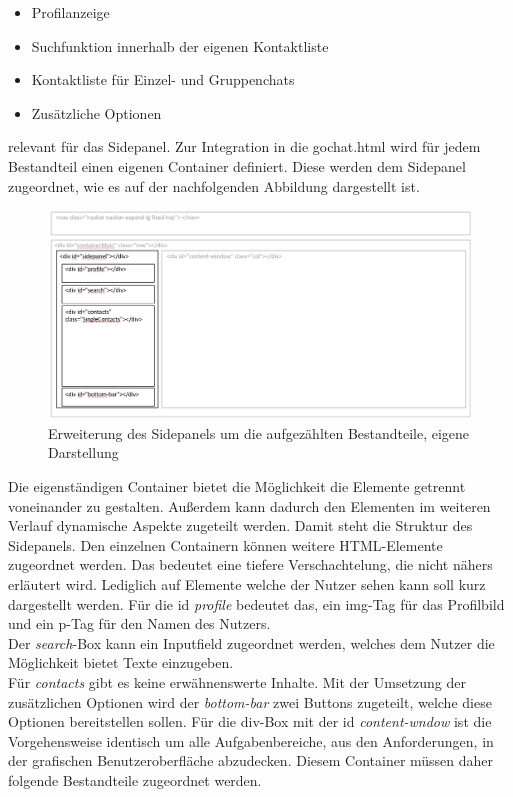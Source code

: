 \documentclass[a4paper,titlepage,halfparskip,12pt]{scrreprt}
\begin{document}
\begin{onehalfspacing}
\begin{itemize}
	\item Profilanzeige
	\item Suchfunktion innerhalb der eigenen Kontaktliste
	\item Kontaktliste für Einzel- und Gruppenchats
	\item Zusätzliche Optionen
\end{itemize}
relevant für das Sidepanel. Zur Integration in die gochat.html wird für jedem Bestandteil einen eigenen Container definiert. Diese werden dem Sidepanel zugeordnet, wie es auf der nachfolgenden Abbildung dargestellt ist.
\begin{figure}[h]
	\centering
	\includegraphics[width=\linewidth]{images/BasisStruktur1GochatSidepanel}
	\caption{Erweiterung des Sidepanels um die aufgezählten Bestandteile, eigene Darstellung}
	\label{img:Sidepanel}
\end{figure}
Die eigenständigen Container bietet die Möglichkeit die Elemente getrennt voneinander zu gestalten. Außerdem kann dadurch den Elementen im weiteren Verlauf dynamische Aspekte zugeteilt werden. Damit steht die Struktur des Sidepanels. Den einzelnen Containern können weitere HTML-Elemente zugeordnet werden. Das bedeutet eine tiefere Verschachtelung, die nicht nähers erläutert wird. Lediglich auf Elemente welche der Nutzer sehen kann soll kurz dargestellt werden. Für die id \textit{profile} bedeutet das, ein img-Tag für das Profilbild und ein p-Tag für den Namen des Nutzers.\\
Der \textit{search}-Box kann ein Inputfield zugeordnet werden, welches dem Nutzer die Möglichkeit bietet Texte einzugeben. \cite{bootstrapOnline}\\
Für \textit{contacts} gibt es keine erwähnenswerte Inhalte. Mit der Umsetzung der zusätzlichen Optionen wird der \textit{bottom-bar} zwei Buttons zugeteilt, welche diese Optionen bereitstellen sollen. Für die div-Box mit der id \textit{content-wndow} ist die Vorgehensweise identisch um alle Aufgabenbereiche, aus den Anforderungen, in der grafischen Benutzeroberfläche abzudecken. Diesem Container müssen daher folgende Bestandteile zugeordnet werden.

\end{onehalfspacing}
\end{document}
